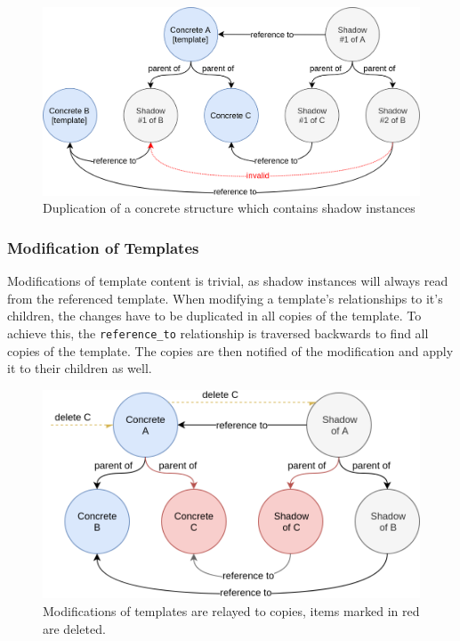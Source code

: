 \documentclass[a4paper,11pt]{article}
\def\inline{\lstinline[basicstyle=\ttfamily,keywordstyle={}]}
\begin{document}
                    \begin{figure}[H]
                        \centering
                        \includegraphics[width=.9\textwidth]{template-contains-copies}
                        \caption{Duplication of a concrete structure which contains shadow instances}
                        \label{fig:template-contains-copies}
                    \end{figure}

                \subsubsection{Modification of Templates}
                    Modifications of template content is trivial, as shadow instances
                    will always read from the referenced template.
                    When modifying a template's relationships to it's children,
                    the changes have to be duplicated in all copies of the template.
                    To achieve this, the \inline{reference_to} relationship is
                    traversed backwards to find all copies of the template. The
                    copies are then notified of the modification and apply
                    it to their children as well.

                    \begin{figure}
                        \centering
                        \includegraphics[width=.68\textwidth]{modify-template-structure-delete}
                        \caption{Modifications of templates are relayed to copies, items marked in red are deleted.}
                        \label{fig:shadow-concept}
                    \end{figure}
\end{document}
